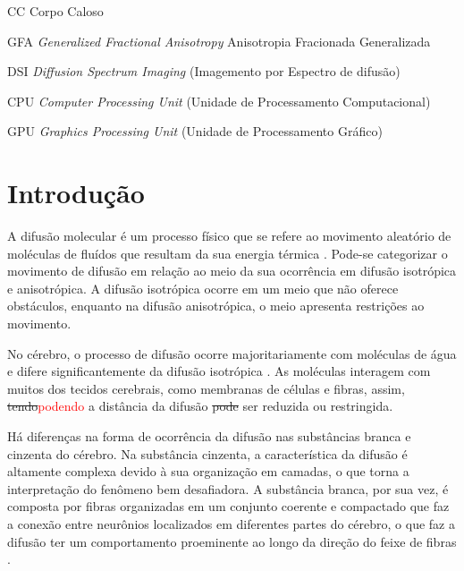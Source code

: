 \documentclass[
    12pt,                %
    oneside,            %
    a4paper,            %
    english,            %
    french,                %
    spanish,            %
    brazil                %
    ]{abntex2}
\begin{document}
\begin{siglas}
\item[CC] Corpo Caloso

\item[GFA] \textit{Generalized Fractional Anisotropy} Anisotropia Fracionada Generalizada

\item[DSI] \textit{Diffusion Spectrum Imaging} (Imagemento por Espectro de difusão)

\item [CPU] \textit{Computer Processing Unit} (Unidade de Processamento Computacional)

\item [GPU] \textit{Graphics Processing Unit} (Unidade de Processamento Gráfico)
\end{siglas}





\tableofcontents*
\cleardoublepage



\textual



\chapter{Introdução}
\label{sec:introducao}

A difusão molecular é um processo físico que se refere ao movimento aleatório de moléculas de fluídos que resultam da sua energia térmica \cite{lebihan2006}. 
Pode-se categorizar o movimento de difusão em relação ao meio da sua ocorrência em difusão isotrópica e anisotrópica. A difusão isotrópica ocorre em um meio que não oferece obstáculos, enquanto na difusão anisotrópica, o meio apresenta restrições ao movimento.

No cérebro, o processo de difusão ocorre majoritariamente com moléculas de água e difere significantemente da difusão isotrópica \cite{lebihan2006}. As moléculas interagem com muitos dos tecidos cerebrais, como membranas de células e fibras, assim, \sout{tendo}\textcolor{red}{podendo} a distância da difusão \sout{pode} ser reduzida ou restringida.


Há diferenças na forma de ocorrência da difusão nas substâncias branca e cinzenta do cérebro. Na substância cinzenta, a característica da difusão é altamente complexa devido à sua organização em camadas, o que torna a interpretação do fenômeno bem desafiadora. A substância branca, por sua vez, é composta por fibras organizadas em um conjunto coerente e compactado que faz a conexão entre neurônios localizados em diferentes partes do cérebro, o que faz a difusão ter um comportamento proeminente ao longo da direção do feixe de fibras \cite{DTI_Handbook}.
\end{document}

